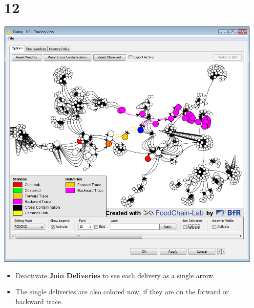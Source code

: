 \documentclass{beamer}
\begin{document}
\section{12}
\begin{frame}
	\begin{center}
  		\includegraphics[height=0.6\textheight]{12.png}
	\end{center}
	\begin{itemize}
		\item Deactivate \textbf{Join Deliveries} to see each delivery as a single arrow.
		\item The single deliveries are also colored now, if they are on the forward or backward trace.
	\end{itemize}
\end{frame}
\end{document}
